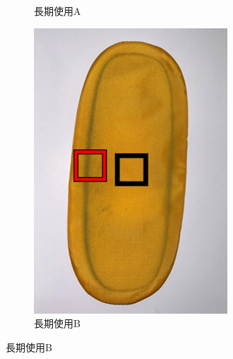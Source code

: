 \documentclass[main]{subfiles}
\begin{document}
\begin{figure}[htbp]
\begin{subfigure}[htbp]{0.3\linewidth}
        \caption{長期使用A}
        \label{fig:label}
    \end{subfigure}
    \begin{subfigure}[htbp]{0.3\linewidth}
        \centering
        \includegraphics[keepaspectratio, width=0.8\linewidth, height=\linewidth]{figures/caring_brush_pad/choukiB.png}
        \caption{長期使用B}
        \label{fig:label}
    \end{subfigure}
\end{figure}
\end{document}
